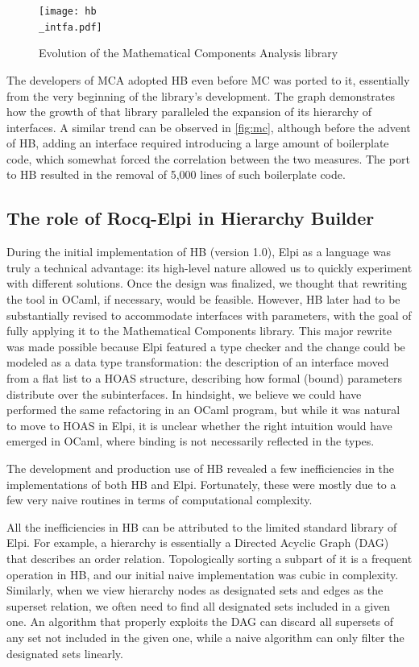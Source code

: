 \documentclass[a4paper, 11pt]{book}
\begin{document}
\begin{figure}[!hb]
\texttt{[image: hb\\\_intfa.pdf]}
\caption{Evolution of the Mathematical Components Analysis library\label{fig:mca}}
\end{figure}


The developers of MCA adopted HB even before MC was ported to it, essentially
from the very beginning of the library's development. The graph demonstrates
how the growth of that library paralleled the expansion of its hierarchy of
interfaces. A similar trend can be observed in \cref{fig:mc}, although before
the advent of HB, adding an interface required introducing a large amount of
boilerplate code, which somewhat forced the correlation between the two
measures. The port to HB resulted in the removal of 5,000 lines of such
boilerplate code.

\subsection{The role of Rocq-Elpi in Hierarchy Builder}

During the initial implementation of HB (version 1.0), Elpi as a language was
truly a technical advantage: its high-level nature allowed us to quickly
experiment with different solutions. Once the design was finalized, we thought
that rewriting the tool in OCaml, if necessary, would be feasible. However, HB
later had to be substantially revised to accommodate interfaces with
parameters, with the goal of fully applying it to the Mathematical Components
library. This major rewrite was made possible because Elpi featured a type
checker and the change could be modeled as a data type transformation: the
description of an interface moved from a flat list to a HOAS structure,
describing how formal (bound) parameters distribute over the subinterfaces. In
hindsight, we believe we could have performed the same refactoring in an OCaml
program, but while it was natural to move to HOAS in Elpi, it is unclear
whether the right intuition would have emerged in OCaml, where binding is not
necessarily reflected in the types.


The development and production use of HB revealed a few inefficiencies in the
implementations of both HB and Elpi. Fortunately, these were mostly due to a
few very naive routines in terms of computational complexity.

All the inefficiencies in HB can be attributed to the limited standard library
of Elpi. For example, a hierarchy is essentially a Directed Acyclic Graph
(DAG) that describes an order relation. Topologically sorting a subpart of it
is a frequent operation in HB, and our initial naive implementation was cubic
in complexity. Similarly, when we view hierarchy nodes as designated sets and
edges as the superset relation, we often need to find all designated sets
included in a given one. An algorithm that properly exploits the DAG can
discard all supersets of any set not included in the given one, while a naive
algorithm can only filter the designated sets linearly.
\end{document}
